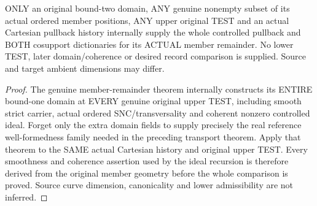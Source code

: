 \begin{theorem}
\label{hir:original-member-untested-controlled-smooth-dictionary}
\leanok
ONLY an original bound-two domain, ANY genuine nonempty subset of its
actual ordered member positions, ANY upper original TEST and an actual
Cartesian pullback history internally supply the whole controlled
pullback and BOTH cosupport dictionaries for its ACTUAL member
remainder. No lower TEST, later domain/coherence or desired record
comparison is supplied. Source and target ambient dimensions may differ.
\end{theorem}
\begin{proof}
The genuine member-remainder theorem internally constructs its ENTIRE
bound-one domain at EVERY genuine original upper TEST, including smooth
strict carrier, actual ordered SNC/transversality and coherent nonzero
controlled ideal. Forget only the extra domain fields to supply precisely
the real reference well-formedness family needed in the preceding
transport theorem. Apply that theorem to the SAME actual Cartesian
history and original upper TEST. Every smoothness and coherence assertion
used by the ideal recursion is therefore derived from the original
member geometry before the whole comparison is proved. Source curve
dimension, canonicality and lower admissibility are not inferred.
\end{proof}

